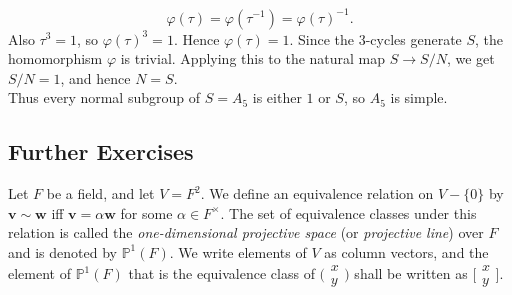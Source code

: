 \documentclass[../Odyssey_Project.tex]{subfiles}
\begin{document}
\begin{solution}
\[
    \varphi(\tau)=\varphi(\tau^{-1})=\varphi(\tau)^{-1}.
\]
Also $\tau^3=1$, so $\varphi(\tau)^3=1$. Hence $\varphi(\tau)=1$. Since the $3$-cycles generate $S$, the homomorphism $\varphi$ is trivial. Applying this to the natural map $S\to S/N$, we get $S/N=1$, and hence $N=S$.\\
Thus every normal subgroup of $S=A_5$ is either $1$ or $S$, so $A_5$ is simple.
\end{solution}

\subsection*{Further Exercises}

Let $F$ be a field, and let $V = F^2$. We define an equivalence relation on $V - \{0\}$ by $\mathbf{v} \sim \mathbf{w}$ iff $\mathbf{v} = \alpha \mathbf{w}$ for some $\alpha \in F^{\times}$. The set of equivalence classes under this relation is called the \emph{one-dimensional projective space} (or \emph{projective line}) over $F$ and is denoted by $\mathbb{P}^1(F)$. We write elements of $V$ as column vectors, and the element of $\mathbb{P}^1(F)$ that is the equivalence class of $\bigl(\begin{smallmatrix}x\\ y\end{smallmatrix}\bigr)$ shall be written as $\bigl[\begin{smallmatrix}x\\ y\end{smallmatrix}\bigr]$.
\end{document}
